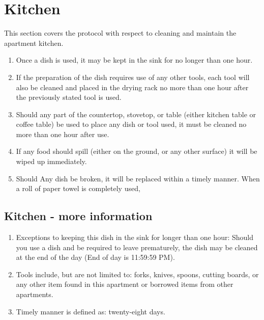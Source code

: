 \documentclass[10pt]{article}
\begin{document}
\section{Kitchen}
This section covers the protocol with respect to cleaning and maintain the apartment kitchen.
\begin{enumerate}
	\item Once a dish is used, it may be kept in the sink for no longer than one hour.
	\item If the preparation of the dish requires use of any other tools, each tool will also be cleaned and placed in the drying rack no more than one hour after the previously stated tool is used. 
	\item Should any part of the countertop, stovetop, or table (either kitchen table or coffee table) be used to place any dish or tool used, it must be cleaned no more than one hour after use.
	\item If any food should spill (either on the ground, or any other surface) it will be wiped up immediately.
	\item Should Any dish be broken, it will be replaced within a timely manner.
	When a roll of paper towel is completely used, 
	
\end{enumerate}
\subsection{Kitchen - more information}
\begin{enumerate}
	\item Exceptions to keeping this dish in the sink for longer than one hour: Should you use a dish and be required to leave prematurely, the dish may be cleaned at the end of the day (End of day is 11:59:59 PM).
	\item Tools include, but are not limited to: forks, knives, spoons, cutting boards, or any other item found in this apartment or borrowed items from other apartments.
	\item Timely manner is defined as: twenty-eight days.
	
\end{enumerate}
\end{document}
